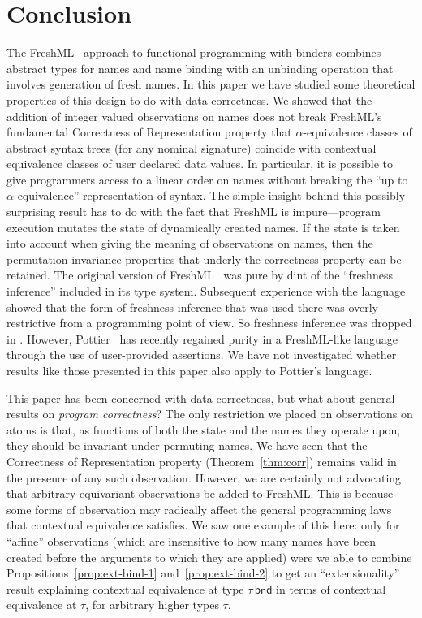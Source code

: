 \documentclass{LMCS}
\theoremstyle{plain}
\theoremstyle{definition}
\newcommand{\BINDTY}{\kw{bnd}}
\newcommand{\kw}[1]{\mathsf{#1}}
\newcommand{\ty}{\tau}
\begin{document}
\section{Conclusion}
\label{sec:conclusion}

The FreshML~\cite{PittsAM:frepbm,ShinwellMR:freona} approach to
functional programming with binders combines abstract types for names
and name binding with an unbinding operation that involves generation
of fresh names.  In this paper we have studied some theoretical
properties of this design to do with data correctness. We showed that
the addition of integer valued observations on names does not break
FreshML's fundamental Correctness of Representation property that
$\alpha$-equivalence classes of abstract syntax trees (for any nominal
signature) coincide with contextual equivalence classes of user
declared data values. In particular, it is possible to give
programmers access to a linear order on names without breaking the
``up to $\alpha$-equivalence'' representation of syntax. The simple
insight behind this possibly surprising result has to do with the fact
that FreshML is impure---program execution mutates the state of
dynamically created names. If the state is taken into account when
giving the meaning of observations on names, then the permutation
invariance properties that underly the correctness property can be
retained.  The original version of FreshML~\cite{PittsAM:metpbn} was
pure by dint of the ``freshness inference'' included in its type
system. Subsequent experience with the language showed that the form
of freshness inference that was used there was overly restrictive from
a programming point of view. So freshness inference was dropped in
\cite{PittsAM:frepbm}.  However, Pottier~\cite{PottierF:stancf} has
recently regained purity in a FreshML-like language through the use of
user-provided assertions. We have not investigated whether results
like those presented in this paper also apply to Pottier's language.

This paper has been concerned with data correctness, but what about
general results on \emph{program correctness}? The only restriction we
placed on observations on atoms is that, as functions of both the
state and the names they operate upon, they should be invariant under
permuting names. We have seen that the Correctness of Representation
property (Theorem~\ref{thm:corr}) remains valid in the presence of any
such observation. However, we are certainly not advocating that
arbitrary equivariant observations be added to FreshML. This is
because some forms of observation may radically affect the general
programming laws that contextual equivalence satisfies.  We saw one
example of this here: only for ``affine'' observations (which are
insensitive to how many names have been created before the arguments
to which they are applied) were we able to combine
Propositions~\ref{prop:ext-bind-1} and~\ref{prop:ext-bind-2} to get an
``extensionality'' result explaining contextual equivalence at type
$\ty\,\BINDTY$ in terms of contextual equivalence at $\ty$, for
arbitrary higher types $\ty$.
\end{document}
